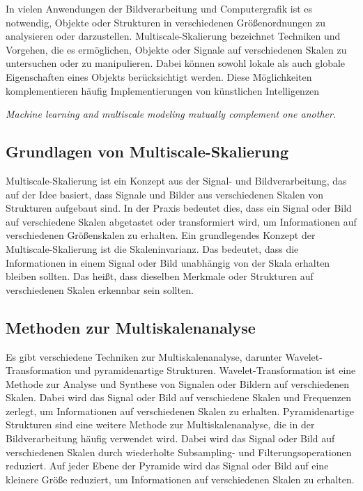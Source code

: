     In vielen Anwendungen der Bildverarbeitung und Computergrafik ist es notwendig, Objekte oder Strukturen in verschiedenen Größenordnungen zu analysieren oder darzustellen.      
    Multiscale-Skalierung bezeichnet Techniken und Vorgehen, die es ermöglichen, Objekte oder Signale auf verschiedenen Skalen zu untersuchen oder zu manipulieren.      
    Dabei können sowohl lokale als auch globale Eigenschaften eines Objekts berücksichtigt werden.
    Diese Möglichkeiten komplementieren häufig Implementierungen von künstlichen Intelligenzen

    \begin{center}
        \textit{Machine learning and multiscale modeling mutually complement one another.}
    \end{center}
    
    \subsection{Grundlagen von Multiscale-Skalierung}
    
        Multiscale-Skalierung ist ein Konzept aus der Signal- und Bildverarbeitung, das auf der Idee basiert, dass Signale und Bilder aus verschiedenen Skalen von Strukturen aufgebaut sind.
        In der Praxis bedeutet dies, dass ein Signal oder Bild auf verschiedene Skalen abgetastet oder transformiert wird, um Informationen auf verschiedenen Größenskalen zu erhalten.
        Ein grundlegendes Konzept der Multiscale-Skalierung ist die Skaleninvarianz.      
        Das bedeutet, dass die Informationen in einem Signal oder Bild unabhängig von der Skala erhalten bleiben sollten.      
        Das heißt, dass dieselben Merkmale oder Strukturen auf verschiedenen Skalen erkennbar sein sollten.
    
    \subsection{Methoden zur Multiskalenanalyse}
    
        Es gibt verschiedene Techniken zur Multiskalenanalyse, darunter Wavelet-Transformation und pyramidenartige Strukturen.      
        Wavelet-Transformation ist eine Methode zur Analyse und Synthese von Signalen oder Bildern auf verschiedenen Skalen.      
        Dabei wird das Signal oder Bild auf verschiedene Skalen und Frequenzen zerlegt, um Informationen auf verschiedenen Skalen zu erhalten.
        Pyramidenartige Strukturen sind eine weitere Methode zur Multiskalenanalyse, die in der Bildverarbeitung häufig verwendet wird.      
        Dabei wird das Signal oder Bild auf verschiedenen Skalen durch wiederholte Subsampling- und Filterungsoperationen reduziert.      
        Auf jeder Ebene der Pyramide wird das Signal oder Bild auf eine kleinere Größe reduziert, um Informationen auf verschiedenen Skalen zu erhalten.
    
